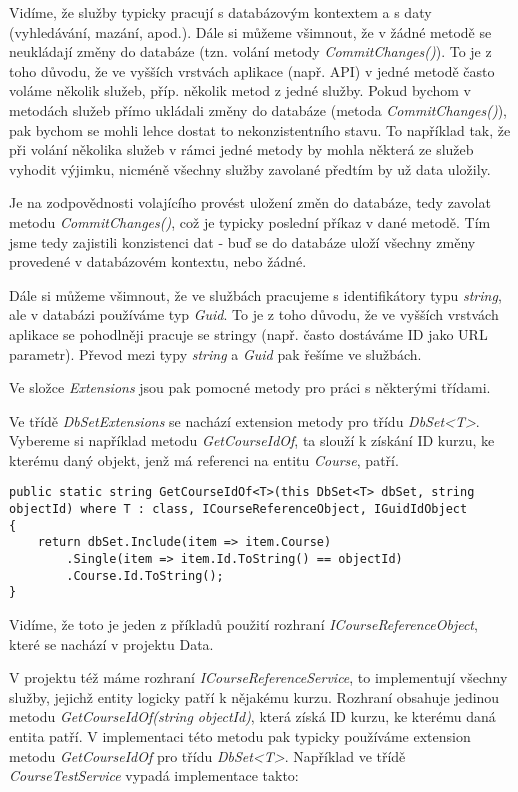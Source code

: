 Vidíme, že služby typicky pracují s databázovým kontextem a s daty (vyhledávání, mazání, apod.).
Dále si můžeme všimnout, že v žádné metodě se neukládají změny do databáze (tzn. volání metody \textit{CommitChanges()}). To je z toho důvodu, že ve vyšších vrstvách aplikace (např. API) v jedné metodě často voláme několik služeb, příp. několik metod z jedné služby. 
Pokud bychom v metodách služeb přímo ukládali změny do databáze (metoda \textit{CommitChanges()}), pak bychom se mohli lehce dostat to nekonzistentního stavu. To například tak, že při volání několika služeb v rámci jedné metody by 
mohla některá ze služeb vyhodit výjimku, nicméně všechny služby zavolané předtím by už data uložily.

Je na zodpovědnosti volajícího provést uložení změn do databáze, tedy zavolat metodu \textit{CommitChanges()}, což je typicky poslední příkaz v dané metodě.
Tím jsme tedy zajistili konzistenci dat - buď se do databáze uloží všechny změny provedené v databázovém kontextu, nebo žádné.

Dále si můžeme všimnout, že ve službách pracujeme s identifikátory typu \textit{string}, ale v databázi používáme typ \textit{Guid}. To je z toho důvodu, že ve vyšších vrstvách aplikace se pohodlněji pracuje se stringy (např. často dostáváme ID jako URL parametr). Převod mezi typy \textit{string} a \textit{Guid} pak řešíme ve službách.

Ve složce \textit{Extensions} jsou pak pomocné metody pro práci s některými třídami.

Ve třídě \textit{DbSetExtensions} se nachází extension metody pro třídu \textit{DbSet<T>}. Vybereme si například metodu \textit{GetCourseIdOf}, ta slouží k získání ID kurzu, ke kterému daný objekt, jenž má referenci na entitu \textit{Course}, patří.
\begin{lstlisting}
public static string GetCourseIdOf<T>(this DbSet<T> dbSet, string objectId) where T : class, ICourseReferenceObject, IGuidIdObject
{
	return dbSet.Include(item => item.Course)
		.Single(item => item.Id.ToString() == objectId)
		.Course.Id.ToString();
}
\end{lstlisting}

Vidíme, že toto je jeden z příkladů použití rozhraní \textit{ICourseReferenceObject}, které se nachází v projektu Data.

V projektu též máme rozhraní \textit{ICourseReferenceService}, to implementují vše\-chny služby, jejichž entity logicky patří k nějakému kurzu. Rozhraní obsahuje jedinou metodu \textit{GetCourseIdOf(string objectId)}, která získá ID kurzu, ke kterému daná entita patří. V implementaci této metodu pak typicky používáme extension metodu \textit{GetCourseIdOf} pro třídu \textit{DbSet<T>}. Například ve třídě \textit{CourseTestService} vypadá implementace takto:

